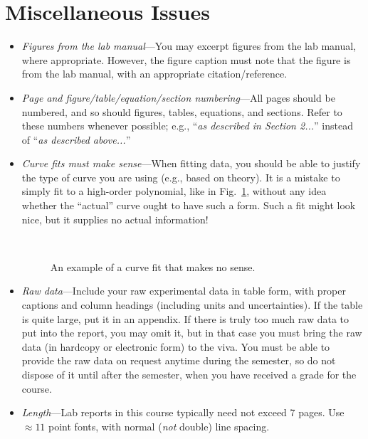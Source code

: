 \documentclass[11pt,a4paper]{article}
\begin{document}
\section{Miscellaneous Issues}

\begin{itemize}

\item \textit{Figures from the lab manual}---You may excerpt figures
  from the lab manual, where appropriate.  However, the figure caption
  must note that the figure is from the lab manual, with an
  appropriate citation/reference.

\item \textit{Page and figure/table/equation/section numbering}---All
  pages should be numbered, and so should figures, tables, equations,
  and sections.  Refer to these numbers whenever possible; e.g.,
  ``\textit{as described in Section 2...}'' instead of ``\textit{as
    described above...}''

\item \textit{Curve fits must make sense}---When fitting data, you
  should be able to justify the type of curve you are using (e.g.,
  based on theory).  It is a mistake to simply fit to a high-order
  polynomial, like in Fig.~\ref{bad-curve-fit}, without any idea
  whether the ``actual'' curve ought to have such a form.  Such a fit
  might look nice, but it supplies no actual information!
  
  \begin{figure}[h]
  \centering
   \\
  \caption{\small An example of a curve fit that makes no sense.}
  \label{bad-curve-fit}
\end{figure}

  
\item \textit{Raw data}---Include your raw experimental data in table
  form, with proper captions and column headings (including units and
  uncertainties).  If the table is quite large, put it in an appendix.
  If there is truly too much raw data to put into the report, you may
  omit it, but in that case you must bring the raw data (in hardcopy
  or electronic form) to the viva.  You must be able to provide the
  raw data on request anytime during the semester, so do not dispose
  of it until after the semester, when you have received a grade for
  the course.

\item \textit{Length}---Lab reports in this course typically need not
  exceed 7 pages.  Use $\approx 11 $ point fonts, with normal
  (\textit{not} double) line spacing.
\end{itemize}
\end{document}
